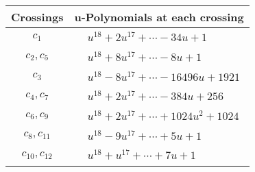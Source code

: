 \documentclass[1p]{elsarticle_modified}
\theoremstyle{definition}
\begin{document}
\begin{tabular}{m{50pt}|m{274pt}}
Crossings & \hspace{64pt}u-Polynomials at each crossing \\
\hline $$\begin{aligned}c_{1}\end{aligned}$$&$\begin{aligned}
&u^{18}+2 u^{17}+\cdots-34 u+1
\end{aligned}$\\
\hline $$\begin{aligned}c_{2},c_{5}\end{aligned}$$&$\begin{aligned}
&u^{18}+8 u^{17}+\cdots-8 u+1
\end{aligned}$\\
\hline $$\begin{aligned}c_{3}\end{aligned}$$&$\begin{aligned}
&u^{18}-8 u^{17}+\cdots-16496 u+1921
\end{aligned}$\\
\hline $$\begin{aligned}c_{4},c_{7}\end{aligned}$$&$\begin{aligned}
&u^{18}+2 u^{17}+\cdots-384 u+256
\end{aligned}$\\
\hline $$\begin{aligned}c_{6},c_{9}\end{aligned}$$&$\begin{aligned}
&u^{18}+2 u^{17}+\cdots+1024 u^2+1024
\end{aligned}$\\
\hline $$\begin{aligned}c_{8},c_{11}\end{aligned}$$&$\begin{aligned}
&u^{18}-9 u^{17}+\cdots+5 u+1
\end{aligned}$\\
\hline $$\begin{aligned}c_{10},c_{12}\end{aligned}$$&$\begin{aligned}
&u^{18}+u^{17}+\cdots+7 u+1
\end{aligned}$\\
\hline
\end{tabular}\\~\\
\newpage\renewcommand{\arraystretch}{1}
\end{document}
